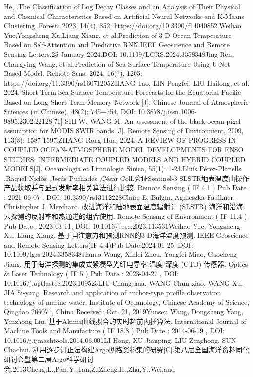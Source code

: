\documentclass[
  12pt,
]{article}
\begin{document}
He, .The Classification of Log Decay Classes and an Analysis of Their
Physical and Chemical Characteristics Based on Artificial Neural
Networks and K-Means Clustering. Forests 2023, 14(4), 852;
https://doi.org/10.3390/f14040852.Weihao Yue,Yongsheng Xu,Liang Xiang,
et al.Prediction of 3-D Ocean Temperature Based on Self-Attention and
Predictive RNN.IEEE Geoscience and Remote Sensing Letters.25 January
2024.DOI: 10.1109/LGRS.2024.3358348Jing Ren, Changying Wang, et
al.Prediction of Sea Surface Temperature Using U-Net Based Model. Remote
Sens. 2024, 16(7), 1205; https://doi.org/10.3390/rs16071205ZHANG Tao,
LIN Pengfei, LIU Hailong, et al. 2024. Short-Term Sea Surface
Temperature Forecasts for the Equatorial Pacific Based on Long
Short-Term Memory Network {[}J{]}. Chinese Journal of Atmospheric
Sciences (in Chinese), 48(2): 745−754. DOI:
10.3878/j.issn.1006-9895.2302.22128{[}71{]} SHI W, WANG M. An assessment
of the black ocean pixel assumption for MODIS SWIR bands {[}J{]}. Remote
Sensing of Environment, 2009, 113(8): 1587-1597.ZHANG Rong-Hua. 2024. A
REVIEW OF PROGRESS IN COUPLED OCEAN-ATMOSPHERE MODEL DEVELOPMENTS FOR
ENSO STUDIES: INTERMEDIATE COUPLED MODELS AND HYBRID COUPLED
MODELS{[}J{]}. Oceanologia et Limnologia Sinica, 55(1): 1-23.Lluís
Pérez-Planells ,Raquel Niclòs ,Jesús Puchades ,César Coll.验证Sentinel-3
SLSTR地表温度由操作产品获取并与显式发射率相关算法进行比较. Remote
Sensing ( IF 4.1 ) Pub Date : 2021-06-07 , DOI: 10.3390/rs13112228Claire
E. Bulgin, Agnieszka Faulkner, Christopher J. Merchant.
改进海洋和陆地表面温度辐射计 (SLSTR)
海洋和沿海云探测的反射率和热通道的组合使用. Remote Sensing of
Environment ( IF 11.4 ) Pub Date : 2023-03-11, DOI:
10.1016/j.rse.2023.113531Weihao Yue, Yongsheng Xu, Liang Xiang.
基于自注意力和预测RNN的3-D海洋温度预测. IEEE Geoscience and Remote
Sensing Letters(IF 4.4)Pub Date:2024-01-25, DOI:
10.1109/lgrs.2024.3358348Jianuo Wang, Xinlei Zhou, Yongfei Miao,
Gaocheng Jiang. 用于海洋探测的集成式紧凑型光纤电导率-温度-深度 (CTD)
传感器. Optics \& Laser Technology ( IF 5 ) Pub Date : 2023-04-27 , DOI:
10.1016/j.optlastec.2023.109523LIU Chang-hua, WANG Chun-xiao, WANG Xu,
JIA Si-yang. Research and application of anchor-type profile observation
technology of marine water. Institute of Oceanology, Chinese Academy of
Science, Qingdao 266071, China Received: Oct. 21, 2019Yunsen Wang,
Dongsheng Yang, Yinzhong Liu. 基于Akima曲线拟合的实时超前内插算法.
International Journal of Machine Tools and Manufacture ( IF 18.8 ) Pub
Date : 2014-06-19 , DOI: 10.1016/j.ijmachtools.2014.06.001LI Hong, XU
Jianping, LIU Zenghong, SUN Chaohui.
利用逐步订正法构建Argo网格资料集的研究{[}C{]}.第八届全国海洋资料同化研讨会暨第二届Argo科学研讨会.2013Cheng,L.,Pan,Y.,Tan,Z.,Zheng,H.,Zhu,Y.,Wei,and
\end{document}
